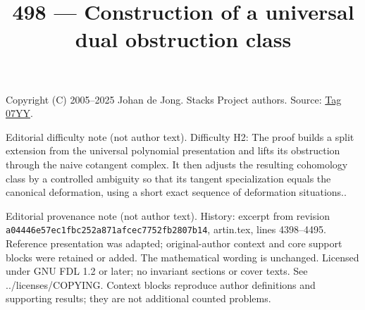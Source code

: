 \documentclass{amsart}
\theoremstyle{plain}
\theoremstyle{definition}
\theoremstyle{remark}
\numberwithin{equation}{subsection}
\begin{document}
\title[Stacks Project, Tag 07YY]{498 --- Construction of a universal dual obstruction class}
\maketitle
\noindent Copyright (C) 2005--2025 Johan de Jong. Stacks Project authors. Source: \href{https://stacks.math.columbia.edu/tag/07YY}{Tag 07YY}.

\noindent Editorial difficulty note (not author text). Difficulty H2: The proof builds a split extension from the universal polynomial presentation and lifts its obstruction through the naive cotangent complex. It then adjusts the resulting cohomology class by a controlled ambiguity so that its tangent specialization equals the canonical deformation, using a short exact sequence of deformation situations..

\noindent Editorial provenance note (not author text). History: excerpt from revision \texttt{a0444\allowbreak 6e57e\allowbreak c1fbc\allowbreak 252a8\allowbreak 71afc\allowbreak ec775\allowbreak 2fb28\allowbreak 07b14}, artin.tex, lines 4398--4495. Reference presentation was adapted; original-author context and core support blocks were retained or added. The mathematical wording is unchanged. Licensed under GNU FDL 1.2 or later; no invariant sections or cover texts. See ../licenses/COPYING. Context blocks reproduce author definitions and supporting results; they are not additional counted problems.
\end{document}

